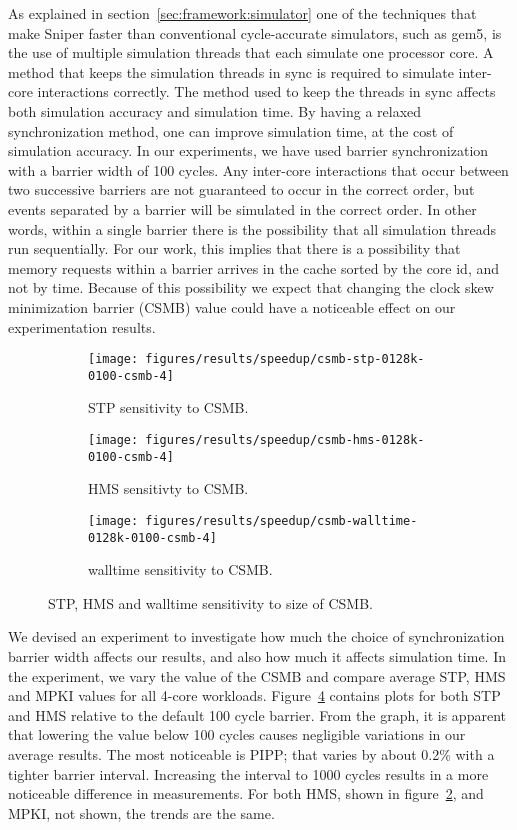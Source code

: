 As explained in section~\ref{sec:framework:simulator} one of the techniques that make Sniper faster than conventional cycle-accurate simulators, such as gem5, is the use of multiple simulation threads that each simulate one processor core.
A method that keeps the simulation threads in sync is required to simulate inter-core interactions correctly.
The method used to keep the threads in sync affects both simulation accuracy and simulation time.
By having a relaxed synchronization method, one can improve simulation time, at the cost of simulation accuracy.
In our experiments, we have used barrier synchronization with a barrier width of 100 cycles.
Any inter-core interactions that occur between two successive barriers are not guaranteed to occur in the correct order, but events separated by a barrier will be simulated in the correct order.
In other words, within a single barrier there is the possibility that all simulation threads run sequentially.
For our work, this implies that there is a possibility that memory requests within a barrier arrives in the cache sorted by the core id, and not by time.
Because of this possibility we expect that changing the clock skew minimization barrier (CSMB) value could have a noticeable effect on our experimentation results.

\begin{figure}[!htb]
    \centering
    \begin{subfigure}[b]{0.5\textwidth}
        \texttt{[image: figures/results/speedup/csmb-stp-0128k-0100-csmb-4]}
        \caption{STP sensitivity to CSMB.}
        \label{fig:results:csmb:stp}
    \end{subfigure}%
    \begin{subfigure}[b]{0.5\textwidth}
        \texttt{[image: figures/results/speedup/csmb-hms-0128k-0100-csmb-4]}
        \caption{HMS sensitivty to CSMB.}
        \label{fig:results:csmb:hms}
    \end{subfigure}
    \begin{subfigure}[b]{0.6\textwidth}
        \texttt{[image: figures/results/speedup/csmb-walltime-0128k-0100-csmb-4]}
        \caption{walltime sensitivity to CSMB.}
        \label{fig:results:csmb:walltime}
    \end{subfigure}
    \caption{STP, HMS and walltime sensitivity to size of CSMB.}
    \label{fig:results:csmb}
\end{figure}


We devised an experiment to investigate how much the choice of synchronization barrier width affects our results, and also how much it affects simulation time.
In the experiment, we vary the value of the CSMB and compare average STP, HMS and MPKI values for all 4-core workloads.
Figure~\ref{fig:results:csmb} contains plots for both STP and HMS relative to the default 100 cycle barrier.
From the graph, it is apparent that lowering the value below 100 cycles causes negligible variations in our average results. 
The most noticeable is PIPP; that varies by about 0.2\% with a tighter barrier interval.
Increasing the interval to 1000 cycles results in a more noticeable difference in measurements.
For both HMS, shown in figure~\ref{fig:results:csmb:hms}, and MPKI, not shown, the trends are the same.

